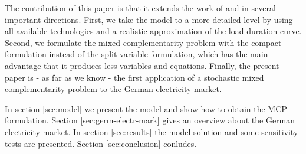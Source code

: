 The contribution of this paper is that it extends the work of \cite{Genc2007} and  \cite{Genc2008} in several important directions. First, we take the model to a more detailed level by using all available technologies and a realistic approximation of the load duration curve. Second, we formulate the mixed complementarity problem with the compact formulation instead of the split-variable formulation, which has the main advantage that it produces less variables and equations. Finally, the present paper is - as far as we know - the first application of a stochastic mixed complementarity problem to the German electricity market.

In section \ref{sec:model} we present the model and show how to obtain the MCP formulation. Section \ref{sec:germ-electr-mark} gives an overview about the German electricity market. In section \ref{sec:results} the model solution and some sensitivity tests are presented. Section \ref{sec:conclusion} conludes.


